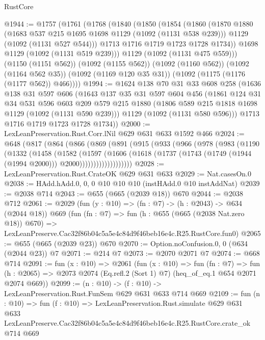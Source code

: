 \begin{lexlean}{RustCore}
\begin{coremodule}
@1944 := @1757
    (@1761
      (@1768
        (@1840
          (@1850
            (@1854
              (@1860
                (@1870
                  @1880
                  (@1683 @537 @215 @1695 @1698 @1129 (@1092 (@1131 @538 @239)))
                  @1129
                  (@1092 (@1131 @527 @544)))
                @1713
                @1716
                @1719
                @1723
                @1728
                @1734))
            @1698
            @1129
            (@1092 (@1131 @519 @239)))
          @1129
          (@1092 (@1131 @475 @559)))
        (@1150 (@1151 @562))
        (@1092 (@1155 @562))
        (@1092 (@1160 @562))
        (@1092 (@1164 @562 @35))
        (@1092 (@1169 @120 @35 @31))
        (@1092 (@1175 (@1176 (@1177 @562)) @466))))
@1994 := @1624
    @138
    @70
    @31
    @33
    @608
    @258
    (@1636
      @138
      @31
      @597
      @606
      (@1643
        @137
        @35
        @31
        @597
        @604
        @456
        (@1861
          @124
          @31
          @34
          @531
          @596
          @603
          @209
          @579
          @215
          @1880
          (@1806 @589 @215 @1818 @1698 @1129 (@1092 (@1131 @590 @239)))
          @1129
          (@1092 (@1131 @580 @596)))
        @1713
        @1716
        @1719
        @1723
        @1728
        @1734))
@2000 := LexLeanPreservation.Rust.Corr.lNil @629 @631 @633 @1592 @466
@2024 := @648
    (@817
      (@864
        (@866
          (@869
            (@891
              (@915
                (@933
                  (@966
                    (@978
                      (@983
                        (@1190
                          (@1332
                            (@1458
                              (@1582
                                (@1597
                                  (@1606
                                    (@1618
                                      (@1737
                                        (@1743
                                          (@1749 (@1944 (@1994 @2000)))
                                          @2000)))))))))))))))))))
@2028 := LexLeanPreservation.Rust.CrateOK @629 @631 @633
@2029 := Nat.casesOn.{0}
@2038 := HAdd.hAdd.{0, 0, 0} @10 @10 @10 (instHAdd.{0} @10 instAddNat)
@2039 := @2038 @714
@2043 := @655 (@665 (@2039 @18)) @670
@2044 := @2038 @712
@2061 := @2029
    (fun (y : @10) => (fn : @7) -> (h : @2043) -> @634 (@2044 @18))
    @669
    (fun (fn : @7) =>
    fun (h : @655 (@665 (@2038 Nat.zero @18)) @670) =>
    LexLeanPreserve.Cac32f86b04c5a5e4c84d9f46beb16e4c.R25.RustCore.fun0)
@2065 := @655 (@665 (@2039 @23)) @670
@2070 := Option.noConfusion.{0, 0} (@634 (@2044 @23)) @7
@2071 := @214 @7
@2073 := @2070 @2071 @7
@2074 := @668 @714
@2091 := fun (x : @10) =>
  @2061
    (fun (x : @10) =>
    fun (fn : @7) =>
    fun (h : @2065) => @2073 @2074 (Eq.refl.{2} (Sort 1) @7) (heq_of_eq.{1} @654 @2071 @2074 @669))
@2099 := (n : @10) -> (f : @10) -> LexLeanPreservation.Rust.FunSem @629 @631 @633 @714 @669
@2109 := fun (n : @10) =>
  fun (f : @10) =>
  LexLeanPreservation.Rust.simulate
    @629
    @631
    @633
    LexLeanPreserve.Cac32f86b04c5a5e4c84d9f46beb16e4c.R25.RustCore.crate_ok
    @714
    @669
\end{coremodule}
\end{lexlean}
